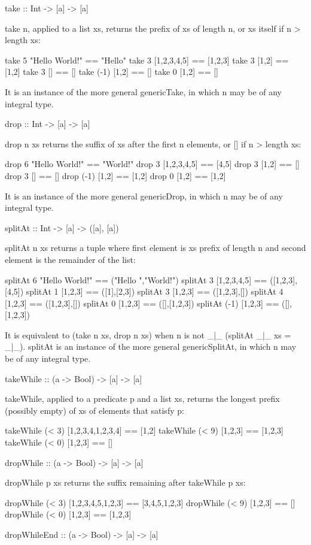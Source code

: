 take :: Int -> [a] -> [a]

take n, applied to a list xs, returns the prefix of xs of length n, or xs itself if n > length xs:

take 5 "Hello World!" == "Hello"
take 3 [1,2,3,4,5] == [1,2,3]
take 3 [1,2] == [1,2]
take 3 [] == []
take (-1) [1,2] == []
take 0 [1,2] == []

It is an instance of the more general genericTake, in which n may be of any integral type.

drop :: Int -> [a] -> [a]

drop n xs returns the suffix of xs after the first n elements, or [] if n > length xs:

drop 6 "Hello World!" == "World!"
drop 3 [1,2,3,4,5] == [4,5]
drop 3 [1,2] == []
drop 3 [] == []
drop (-1) [1,2] == [1,2]
drop 0 [1,2] == [1,2]

It is an instance of the more general genericDrop, in which n may be of any integral type.

splitAt :: Int -> [a] -> ([a], [a])

splitAt n xs returns a tuple where first element is xs prefix of length n and second element is the remainder of the list:

splitAt 6 "Hello World!" == ("Hello ","World!")
splitAt 3 [1,2,3,4,5] == ([1,2,3],[4,5])
splitAt 1 [1,2,3] == ([1],[2,3])
splitAt 3 [1,2,3] == ([1,2,3],[])
splitAt 4 [1,2,3] == ([1,2,3],[])
splitAt 0 [1,2,3] == ([],[1,2,3])
splitAt (-1) [1,2,3] == ([],[1,2,3])

It is equivalent to (take n xs, drop n xs) when n is not \_|\_ (splitAt \_|\_ xs = \_|\_). splitAt is an instance of the more general genericSplitAt, in which n may be of any integral type.

takeWhile :: (a -> Bool) -> [a] -> [a]

takeWhile, applied to a predicate p and a list xs, returns the longest prefix (possibly empty) of xs of elements that satisfy p:

takeWhile (< 3) [1,2,3,4,1,2,3,4] == [1,2]
takeWhile (< 9) [1,2,3] == [1,2,3]
takeWhile (< 0) [1,2,3] == []

dropWhile :: (a -> Bool) -> [a] -> [a]

dropWhile p xs returns the suffix remaining after takeWhile p xs:

dropWhile (< 3) [1,2,3,4,5,1,2,3] == [3,4,5,1,2,3]
dropWhile (< 9) [1,2,3] == []
dropWhile (< 0) [1,2,3] == [1,2,3]

dropWhileEnd :: (a -> Bool) -> [a] -> [a]


